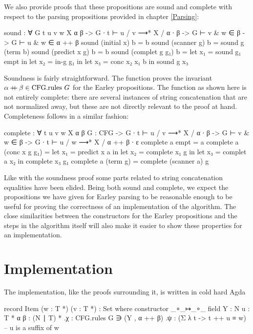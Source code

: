 		We also provide proofs that these propositions are sound and complete
		with respect to the parsing propositions provided in chapter
		\ref{Parsing}:

		\begin{code}
			sound : ∀ {G t u v w X α β} ->
			  G ∙ t ⊢ u / v ⟶* X / α ∙ β ->
			    G ⊢ v & w ∈ β ->
			    G ⊢ u & w ∈ α ++ β
			sound (initial x) b = b
			sound (scanner g) b = sound g (term b)
			sound (predict x g) b = b
			sound (complet g g₁) b =
			  let x₁ = sound g₁ empt in
			  let x₂ = in-g g₁ in
			  let x₃ = conc x₂ x₁ b in
			  sound g x₃
		\end{code}

		Soundness is fairly straightforward. The  function proves
		the invariant $\alpha \mathbin{{+}\mspace{-8mu}{+}} \beta \in \textrm{CFG.rules } G$ for the
		Earley propositions. The function as shown here is not entirely
		complete: there are several instances of string concatenation that
		are not normalized away, but these are not directly relevant to the
		proof at hand. Completeness follows in a similar fashion:

		\begin{code}
			complete : ∀ {t u v w X α β} {G : CFG} ->
			  G ∙ t ⊢ u / v ⟶* X / α ∙ β ->
			  G ⊢ v & w ∈ β ->
			    G ∙ t ⊢ u / w ⟶* X / α ++ β ∙ ε
			complete a empt = a
			complete a (conc x g g₁) =
			  let x₁ = predict x a in
			  let x₂ = complete x₁ g in
			  let x₃ = complet a x₂ in
			  complete x₃ g₁
			complete a (term g) = complete (scanner a) g
		\end{code}

		Like with the soundness proof some parts related to string
		concatenation equalities have been elided. Being both sound and
		complete, we expect the propositions we have given for Earley parsing
		to be reasonable enough to be useful for proving the correctness of an
		implementation of the algorithm. The close similarities between the
		constructors for the Earley propositions and the steps in the algorithm
		itself will also make it easier to show these properties for an
		implementation.

	\section{Implementation}

		The implementation, like the proofs surrounding it, is written in cold
		hard Agda

		\begin{code}
			record Item (w : T *) (v : T *) : Set where
			  constructor _∘_↦_∘_
			  field
			    Y : N
			    u : T *
			    α β : (N ∣ T) *
			    .{χ} : CFG.rules G ∋ (Y , α ++ β)
			    .{ψ} : (Σ λ t -> t ++ u ≡ w)        -- u is a suffix of w
		\end{code}

